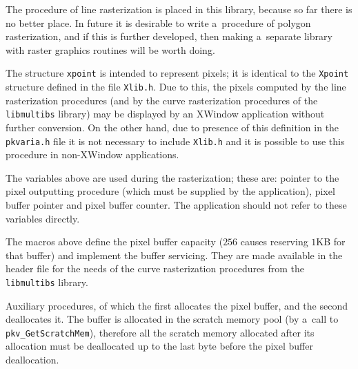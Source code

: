 The procedure of line rasterization is placed in this library, because
so far there is no better place. In future it is desirable to write
a~procedure of polygon rasterization, and if this is further developed,
then making a~separate library with raster graphics routines will be
worth doing.

\vspace{\bigskipamount}
The structure \texttt{xpoint} is intended to represent
pixels; it is identical to the \texttt{Xpoint} structure defined in the file
\texttt{Xlib.h}. Due to this, the pixels computed by the line rasterization
procedures (and by the curve rasterization procedures of the \texttt{libmultibs}
library) may be displayed by an XWindow application without further
conversion. On the other hand, due to presence of this definition in the
\texttt{pkvaria.h} file it is not necessary to include \texttt{Xlib.h}
and it is possible to use this procedure in non-XWindow applications.

\vspace{\bigskipamount}
The variables above are used during the rasterization; these are:
pointer to the pixel outputting procedure (which must be supplied by the
application), pixel buffer pointer and pixel buffer counter. The application
should not refer to these variables directly.

\vspace{\bigskipamount}
The macros above define the pixel buffer capacity ($256$ causes reserving
$1$KB for that buffer) and implement the buffer servicing. They are made
available in the header file for the needs of the curve rasterization
procedures from the \texttt{libmultibs} library.

\vspace{\bigskipamount}                              
Auxiliary procedures, of which the first allocates the pixel buffer, and
the second deallocates it. The buffer is allocated in the scratch memory pool
(by a~call to \texttt{pkv\_GetScratchMem}), therefore all the scratch memory
allocated after its allocation must be deallocated up to the last byte
before the pixel buffer deallocation.

